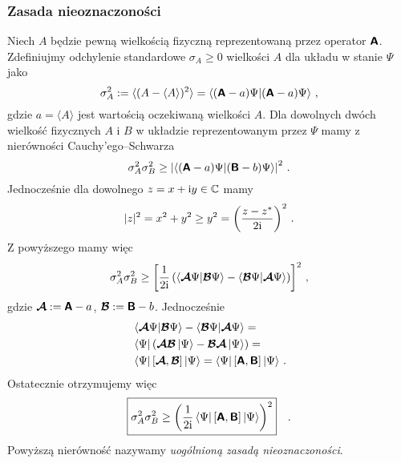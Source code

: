 \documentclass{myclass}
\begin{document}
\subsubsection{Zasada nieoznaczoności}

Niech \(A\) będzie pewną wielkością fizyczną reprezentowaną przez operator \(\boldsymbol{\mathsf{A}}\). Zdefiniujmy
odchylenie standardowe \(\sigma_A \geq 0\) wielkości \(A\) dla układu w stanie \(\Psi\) jako
\begin{equation*}
    \sigma_A^2 := \langle (A - \langle A \rangle)^2 \rangle = \braket{(\boldsymbol{\mathsf{A}}-a)\Psi}{(\boldsymbol{\mathsf{A}}-a)\Psi}\,,
\end{equation*}
gdzie \(a = \langle A \rangle\) jest wartością oczekiwaną wielkości \(A\). Dla dowolnych dwóch
wielkość fizycznych \(A\) i \(B\) w układzie reprezentowanym przez \(\Psi\) mamy z nierówności
Cauchy'ego--Schwarza
\begin{equation*}
    \sigma_A^2\sigma_B^2 \geq \left|\braket{(\boldsymbol{\mathsf{A}}-a)\Psi}{(\boldsymbol{\mathsf{B}}-b)\Psi}\right|^2\,.
\end{equation*}
Jednocześnie dla dowolnego \(z = x + \mathrm{i} y \in\mathbb{C}\) mamy
\begin{equation*}
    |z|^2 = x^2 + y^2 \geq y^2 = \left(\frac{z-z^*}{2\mathrm{i}}\right)^2\,.
\end{equation*}
Z powyższego mamy więc
\begin{equation*}
    \sigma_A^2\sigma_B^2 \geq \left[\frac{1}{2\mathrm{i}}\left(\braket{\boldsymbol{\mathsf{\mathcal{A}}}\Psi}{\boldsymbol{\mathsf{\mathcal{B}}}\Psi} - \braket{\boldsymbol{\mathsf{\mathcal{B}}}\Psi}{\boldsymbol{\mathsf{\mathcal{A}}}\Psi}\right)\right]^2\,,
\end{equation*}
gdzie \(\boldsymbol{\mathsf{\mathcal{A}}} := \boldsymbol{\mathsf{A}} - a\), \(\boldsymbol{\mathsf{\mathcal{B}}} := \boldsymbol{\mathsf{B}} - b\). Jednocześnie
\begin{equation*}
    \begin{split}
        &\braket{\boldsymbol{\mathsf{\mathcal{A}}}\Psi}{\boldsymbol{\mathsf{\mathcal{B}}}\Psi} - \braket{\boldsymbol{\mathsf{\mathcal{B}}}\Psi}{\boldsymbol{\mathsf{\mathcal{A}}}\Psi} =\\
        &\bra{\Psi}(\boldsymbol{\mathsf{\mathcal{A}}}\boldsymbol{\mathsf{\mathcal{B}}}\ket{\Psi}-\boldsymbol{\mathsf{\mathcal{B}}}\boldsymbol{\mathsf{\mathcal{A}}}\ket{\Psi})=\\
        &\bra{\Psi}[\boldsymbol{\mathsf{\mathcal{A}}},\boldsymbol{\mathsf{\mathcal{B}}}]\ket{\Psi} = \bra{\Psi}[\boldsymbol{\mathsf{A}},\boldsymbol{\mathsf{B}}]\ket{\Psi}\,.
    \end{split}
\end{equation*}
Ostatecznie otrzymujemy więc
\begin{equation*}
    \boxed{
    \sigma_A^2\sigma_B^2 \geq \left(\frac{1}{2\mathrm{i}}\bra{\Psi}[\boldsymbol{\mathsf{A}},\boldsymbol{\mathsf{B}}]\ket{\Psi}\right)^2
    }\quad.
\end{equation*}
Powyższą nierówność nazywamy \textit{uogólnioną zasadą nieoznaczoności}.
\end{document}
